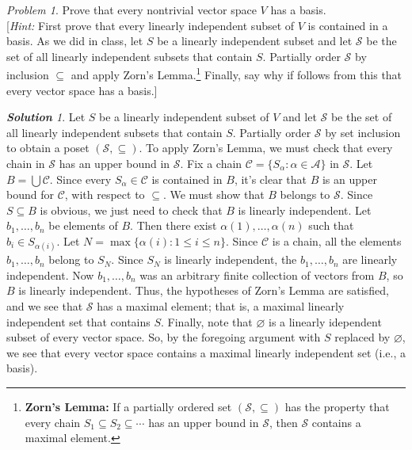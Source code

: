 \documentclass[11pt]{paper}
\theoremstyle{remark}
\newtheorem{problem}{Problem}
\newtheorem*{solution}{{\bf Solution}}
\newcommand\0{\ensuremath{\mathbf{0}}}
\newcommand{\<}{\ensuremath{\langle}}
\renewcommand{\>}{\ensuremath{\rangle}}
\renewcommand{\emptyset}{\ensuremath{\varnothing}}
\renewcommand{\leq}{\ensuremath{\leqslant}}
\newcommand{\sS}{\ensuremath{\mathscr{S}}}
\newcommand{\sC}{\ensuremath{\mathscr{C}}}
\newcommand{\sA}{\ensuremath{\mathscr{A}}}
\begin{document}
\probskip

\begin{problem}  %
\label{prob:zorn}
Prove that every nontrivial vector space $V$ has a basis.\\[4pt]
[{\it Hint:} First prove that
every linearly independent subset of $V$ is contained in a basis.
As we did in class, let $S$ be a linearly independent subset and
  let $\sS$ be the set of all linearly independent subsets that contain $S$. 
  Partially order $\sS$ by inclusion $\subseteq$ and apply
  Zorn's Lemma.\footnote{{\bf Zorn's Lemma:} 
    If a partially ordered set $(\sS, \subseteq)$ has the property that every
    chain $S_1 \subseteq S_2 \subseteq \cdots$ has an upper bound in $\sS$, 
    then $\sS$ contains a maximal element.}
  Finally, say why if follows from this that every vector space has a basis.]
\end{problem}

\begin{solution}
Let $S$ be a linearly independent subset of $V$ and
  let $\sS$ be the set of all linearly independent subsets that contain $S$. 
 Partially order $\sS$ by set inclusion to obtain a poset 
 $(\sS, \subseteq)$.  To apply
  Zorn's Lemma, we must check that 
every chain in $\sS$ has an upper bound in $\sS$.
Fix a chain $\sC = \{S_\alpha : \alpha \in \sA \}$ in 
$\sS$.  Let $B = \bigcup \sC$. Since every $S_\alpha \in \sC$ is contained in  
$B$, it's clear that $B$ is an upper bound for $\sC$, with respect to
$\subseteq$.
We must show that $B$ belongs to $\sS$. Since $S \subseteq B$ is obvious, we
just need to check that $B$ is linearly independent.  Let 
$b_1, \dots, b_n$ be elements of 
$B$. Then there exist $\alpha(1), \dots, \alpha(n)$ such that 
$b_i \in S_{\alpha(i)}$.  Let $N = \max\{\alpha(i) : 1\leq i \leq n\}$. 
Since $\sC$ is a chain, all the elements $b_1, \dots, b_n$ belong to $S_N$.
Since $S_N$ is linearly independent, the $b_1, \dots, b_n$ are linearly
independent. Now $b_1, \dots, b_n$ was an arbitrary finite collection of vectors
from $B$, so $B$ is linearly independent.
Thus, the hypotheses of Zorn's Lemma are satisfied, and we see that $\sS$
has a maximal element; that is, a maximal linearly independent set that contains
$S$. 
Finally, note that $\emptyset$ is a linearly
idependent subset of every vector space.  So, by the foregoing argument with $S$
replaced by $\emptyset$, we see that every vector space contains a maximal linearly
independent set (i.e., a basis).
\end{solution}
\end{document}
